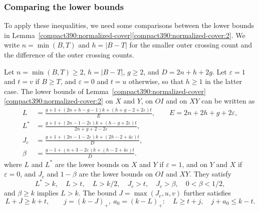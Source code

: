 \subsubsection{Comparing the lower bounds}
To apply these inequalities, we need some comparisons between the lower bounds in Lemma~\ref{compact390:normalized-cover}\ref{compact390:normalized-cover:2}. We write $n=\min(B,T)$ and $h=|B-T|$ for the smaller outer crossing count and the difference of the outer crossing counts.

\begin{lemma}
\label{bulk374:actual-inputs}
\label{inherit376:actual-cut}
Let $n=\min(B,T)\ge2$, $h=|B-T|$, $g\ge2$, and
$D=2n+h+2g$. Let $\varepsilon=1$ and $t=v$ if $B\ge T$,
and $\varepsilon=0$ and $t=u$ otherwise, so that $h\ge1$ in the latter case.
The lower bounds of Lemma~\ref{compact390:normalized-cover}\ref{compact390:normalized-cover:2} on $X$ and $Y$, on $OI$ and on $XY$ can be written as
\[
\begin{split}
 L&=\frac{g+1+(2n+h-g-1)k+(h+g-2+2\varepsilon)t}
              {E},\qquad E=2n+2h+g+2\varepsilon,\\
 L^*&=\frac{g+1+(2n-1-2\varepsilon)k+(h-g+2\varepsilon)t}
              {2n+g+2-2\varepsilon},\\
 J_c&=\frac{g+1+(2n-1-2\varepsilon)k+(2h-2+4\varepsilon)t}{D},\\
 \beta&=\frac{g-1+(n+3-2\varepsilon)k+(h-2+4\varepsilon)t}{D}.
\end{split}
\]
where $L$ and $L^*$ are the lower bounds on $X$ and $Y$ if $\varepsilon=1$, and on
$Y$ and $X$ if $\varepsilon=0$, and $J_c$ and $1-\beta$ are the lower bounds on $OI$ and $XY$.
They satisfy
\[
 L^*>k,\quad L>t,\quad L>k/2,\quad J_c>t,\quad J_c>\beta,
 \quad0<\beta<1/2,
\]
and $\beta\ge k$ implies $L>k$.
The bound $J=\max(J_c,u,v)$ further satisfies
\[
 L+J\ge k+t,\qquad
 j=(k-J)_+,\ a_0=(k-L)_+:\quad L\ge t+j,\quad j+a_0\le k-t.
\]
\end{lemma}
